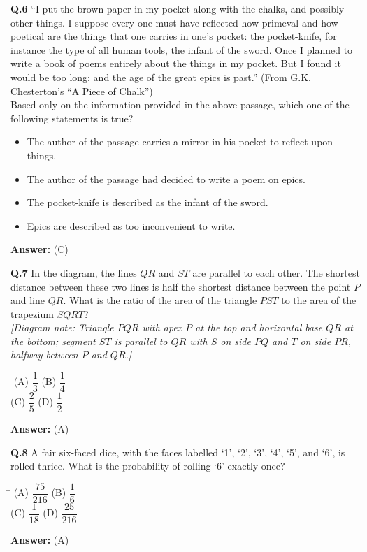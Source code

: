 \documentclass[11pt,a4paper]{article}
\newcommand{\optsfourA}[4]{%
  \begin{tabbing}
    \hspace{0.48\linewidth}\=\kill
    (A) #1 \> (B) #2 \\[2pt]
    (C) #3 \> (D) #4
  \end{tabbing}%
}
\newcommand{\optslistA}[4]{%
  \begin{itemize}
    \setlength{\itemsep}{2pt}\setlength{\parskip}{0pt}
    \item[(A)] #1
    \item[(B)] #2
    \item[(C)] #3
    \item[(D)] #4
  \end{itemize}%
}
\newcommand{\ans}[1]{\textbf{Answer:} #1\par\medskip}
\begin{document}
\textbf{Q.6} ``I put the brown paper in my pocket along with the chalks, and possibly other things. I suppose every one must have reflected how primeval and how poetical are the things that one carries in one's pocket: the pocket-knife, for instance the type of all human tools, the infant of the sword. Once I planned to write a book of poems entirely about the things in my pocket. But I found it would be too long: and the age of the great epics is past.'' \hfill (From G.K. Chesterton's ``A Piece of Chalk'')\\
Based only on the information provided in the above passage, which one of the following statements is true?
\optslistA{The author of the passage carries a mirror in his pocket to reflect upon things.}{The author of the passage had decided to write a poem on epics.}{The pocket-knife is described as the infant of the sword.}{Epics are described as too inconvenient to write.}
\ans{(C)}

\textbf{Q.7} In the diagram, the lines $QR$ and $ST$ are parallel to each other. The shortest distance between these two lines is half the shortest distance between the point $P$ and line $QR$. What is the ratio of the area of the triangle $PST$ to the area of the trapezium $SQRT$?\\
\emph{[Diagram note: Triangle $PQR$ with apex $P$ at the top and horizontal base $QR$ at the bottom; segment $ST$ is parallel to $QR$ with $S$ on side $PQ$ and $T$ on side $PR$, halfway between $P$ and $QR$.]}
\optsfourA{$\dfrac{1}{3}$}{$\dfrac{1}{4}$}{$\dfrac{2}{5}$}{$\dfrac{1}{2}$}
\ans{(A)}

\textbf{Q.8} A fair six-faced dice, with the faces labelled `1', `2', `3', `4', `5', and `6', is rolled thrice. What is the probability of rolling `6' exactly once?
\optsfourA{$\dfrac{75}{216}$}{$\dfrac{1}{6}$}{$\dfrac{1}{18}$}{$\dfrac{25}{216}$}
\ans{(A)}
\end{document}

